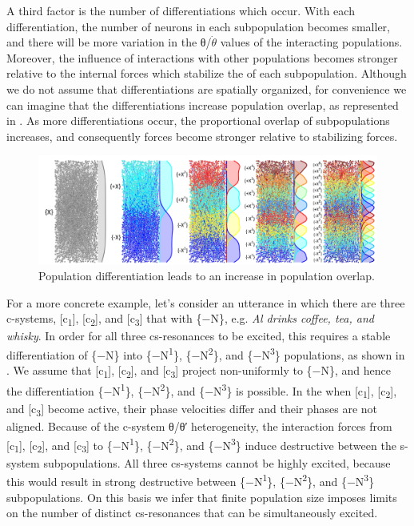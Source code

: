   A third factor is the number of differentiations which occur. With each differentiation, the number of neurons in each subpopulation becomes smaller, and there will be more variation in the θ/$\dot{\theta}$ values of the interacting populations. Moreover, the influence of interactions with other populations becomes stronger relative to the internal forces which stabilize the  of each subpopulation.  Although we do not assume that differentiations are spatially organized, for convenience we can imagine that the differentiations increase population overlap, as represented in {}. As more differentiations occur, the proportional overlap of subpopulations increases, and consequently  forces become stronger relative to stabilizing forces.

  
\begin{figure}
\includegraphics[width=\textwidth]{figures/Tilsen-img91.png}
\caption{Population differentiation leads to an increase in population overlap.}
\label{fig:4:41}
\end{figure}
 

  For a more concrete example, let's consider an utterance in which there are three c-systems, [c\textsubscript{1}], [c\textsubscript{2}], and [c\textsubscript{3}] that  with \{−N\}, e.g. \textit{Al drinks coffee, tea, and whisky}. In order for all three cs-resonances to be excited, this requires a stable differentiation of \{−N\} into \{−N\textsuperscript{1}\}, \{−N\textsuperscript{2}\}, and \{−N\textsuperscript{3}\} populations, as shown in {}. We assume that [c\textsubscript{1}], [c\textsubscript{2}], and [c\textsubscript{3}] project non-uniformly to \{−N\}, and hence the differentiation \{−N\textsuperscript{1}\}, \{−N\textsuperscript{2}\}, and \{−N\textsuperscript{3}\} is possible. In the  when [c\textsubscript{1}], [c\textsubscript{2}], and [c\textsubscript{3}] become active, their phase velocities differ and their phases are not aligned. Because of the c-system θ/θ′ heterogeneity, the interaction forces from [c\textsubscript{1}], [c\textsubscript{2}], and [c\textsubscript{3}] to \{−N\textsuperscript{1}\}, \{−N\textsuperscript{2}\}, and \{−N\textsuperscript{3}\} induce destructive  between the s-system subpopulations. All three cs-systems cannot be highly excited, because this would result in strong destructive  between \{−N\textsuperscript{1}\}, \{−N\textsuperscript{2}\}, and \{−N\textsuperscript{3}\} subpopulations. On this basis we infer that finite population size imposes limits on the number of distinct cs-resonances that can be simultaneously excited.

